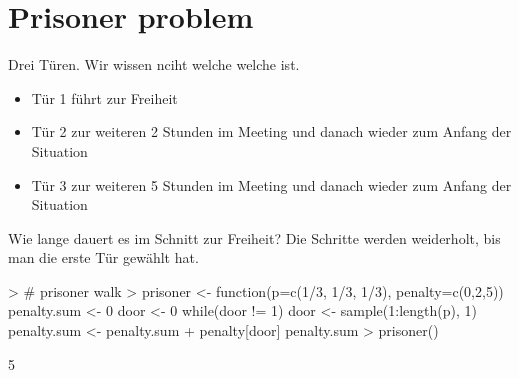 
\renewenvironment{Schunk}{\vspace{10pt}}{\vspace{8pt}}   

\section{Prisoner problem}

Drei Türen. Wir wissen nciht welche welche ist. 
 
\begin{itemize}
\item Tür 1 führt zur Freiheit
\item Tür 2 zur weiteren 2 Stunden im Meeting und danach wieder zum Anfang der Situation  
\item Tür 3 zur weiteren 5 Stunden im Meeting und danach wieder zum Anfang der Situation 
\end{itemize} 

Wie lange dauert es im Schnitt zur Freiheit? Die Schritte werden weiderholt, bis man die erste Tür gewählt hat.

\begin{Schunk}
\begin{Sinput}
> # prisoner walk
> prisoner <- function(p=c(1/3, 1/3, 1/3), penalty=c(0,2,5)){
   penalty.sum <- 0
   door <- 0
   while(door != 1){
     door <- sample(1:length(p), 1)
     penalty.sum <- penalty.sum + penalty[door]    
   }
   penalty.sum  
 }      
> prisoner()
\end{Sinput}
\begin{Soutput}
[1] 5
\end{Soutput}
\end{Schunk}

